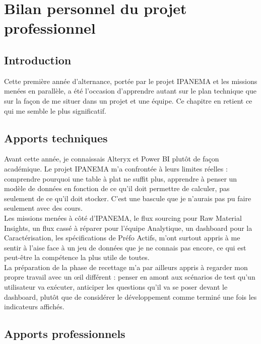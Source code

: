 ﻿\chapter{ Bilan personnel du projet professionnel }
\label{chap4}
\minitoc
\section{Introduction}
Cette première année d'alternance, portée par le projet IPANEMA et les missions 
menées en parallèle, a été l'occasion d'apprendre autant sur le plan technique que sur la 
façon de me situer dans un projet et une équipe. Ce chapitre en retient ce qui me semble le 
plus significatif.
\section{Apports techniques}
Avant cette année, je connaissais Alteryx et Power BI plutôt de façon académique. Le 
projet IPANEMA m'a confrontée à leurs limites réelles : comprendre pourquoi une table à plat 
ne suffit plus, apprendre à penser un modèle de données en fonction de ce qu'il doit 
permettre de calculer, pas seulement de ce qu'il doit stocker. C'est une bascule que je 
n'aurais pas pu faire seulement avec des cours. \\

Les missions menées à côté d'IPANEMA, le flux sourcing pour Raw Material Insights, 
un flux cassé à réparer pour l'équipe Analytique, un dashboard pour la Caractérisation, les 
spécifications de Préfo Actifs, m'ont surtout appris à me sentir à l'aise face à un jeu de 
données que je ne connais pas encore, ce qui est peut-être la compétence la plus utile de 
toutes. \\

La préparation de la phase de recettage m'a par ailleurs appris à regarder mon propre 
travail avec un œil différent : penser en amont aux scénarios de test qu'un utilisateur va 
exécuter, anticiper les questions qu'il va se poser devant le dashboard, plutôt que de 
considérer le développement comme terminé une fois les indicateurs affichés.

\section{Apports professionnels}

